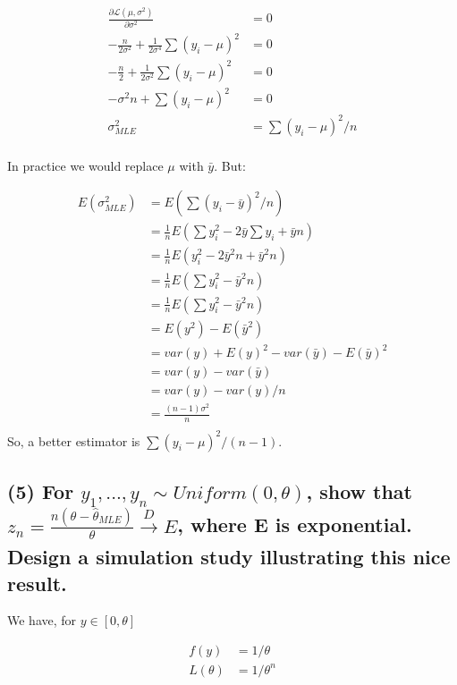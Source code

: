 \documentclass[11pt]{article}
\begin{document}
\begin{align*}
    \frac{\partial \mathcal{L}(\mu, \sigma^2)}{\partial \sigma^2} &= 0 \\
    -\frac{n}{2\sigma^2} + \frac{1}{2\sigma^4}\sum (y_i - \mu)^2&= 0 \\
     -\frac{n}{2} + \frac{1}{2\sigma^2}\sum (y_i - \mu)^2&= 0 \\
     -\sigma^2n +\sum (y_i - \mu)^2&= 0 \\
     \sigma^2_{MLE} &= \sum (y_i - \mu)^2 / n \\
\end{align*}

In practice we would replace $\mu$ with $\bar{y}$. But:

\begin{align*}
    E(\sigma^2_{MLE}) &= E\left(\sum (y_i - \bar{y})^2 / n\right)\\
    &= \frac{1}{n} E\left(\sum y_i^2 - 2\bar{y} \sum y_i + \bar{y}n \right)\\
    &= \frac{1}{n} E\left( y_i^2 - 2\bar{y}^2n + \bar{y}^2n \right)\\
     &= \frac{1}{n} E\left( \sum y_i^2 - \bar{y}^2n \right)\\
      &= \frac{1}{n} E\left( \sum y_i^2 - \bar{y}^2n \right)\\
       &=  E( y^2) - E(\bar{y}^2)\\
          &=  var(y) + E(y)^2 - var(\bar{y}) - E(\bar{y})^2 \\
            &=  var(y)  - var(\bar{y}) \\
              &=  var(y)  - var(y)/n \\
               &=  \frac{(n-1)\sigma^2}{n}\\
\end{align*}
So, a better estimator is $\sum (y_i - \mu)^2 / (n-1) $.

\subsection*{(5) For $y_1,...,y_n \sim Uniform(0, 
\theta)$, show that $ z_n = \frac{n(\theta-\hat{\theta}_{MLE})}{\theta} \xrightarrow[]{D} E$, where E is exponential. Design a simulation study illustrating this nice result.}

We have, for $y \in [0, \theta]$

\begin{align*}
    f(y) &= 1/\theta \\ 
    L(\theta) &= 1/ \theta ^n\\
\end{align*}
\end{document}
